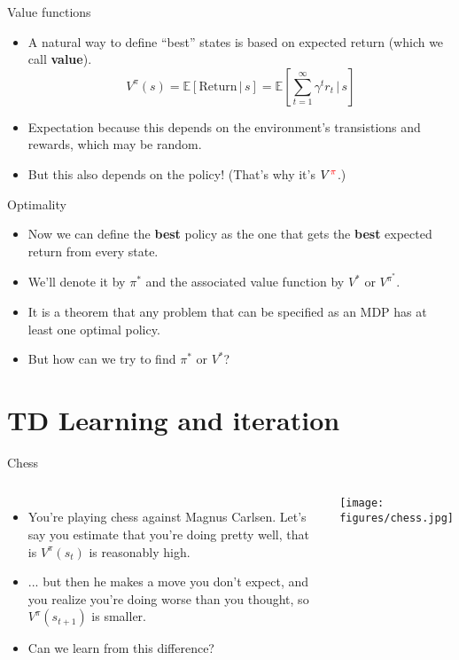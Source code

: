 \documentclass{beamer}
\newcommand{\E}[1]{\mathbb{E}\left[#1\right]}
\begin{document}
\begin{frame}{Value functions} 
\begin{itemize}
\item A natural way to define ``best'' states is based on expected return (which we call \textbf{value}). 
    \[V^\pi(s) = \E{\text{Return} \, |\, s} = \E{\sum_{t=1}^\infty \gamma^t r_t \, \bigg \vert \, s } \]
\item<2-> Expectation because this depends on the environment's transistions and rewards, which may be random.  
\item<3-> But this also depends on the policy! (That's why it's \(V^{\color{red} \pi}\).) 
\end{itemize}
\end{frame}

\begin{frame}{Optimality}
\begin{itemize}
\item Now we can define the \textbf{best} policy as the one that gets the \textbf{best} expected return from every state.
\item<2-> We'll denote it by \(\pi^*\) and the associated value function by \(V^*\) or \(V^{\pi^*}\). 
\item<3-> It is a theorem that any problem that can be specified as an MDP has at least one optimal policy.
\item<4-> But how can we try to find \(\pi^*\) or \(V^*\)?
\end{itemize}
\end{frame}


\section{TD Learning and iteration}
\begin{frame}{Chess}
\begin{columns}
\begin{itemize}
    \item<1-> You're playing chess against Magnus Carlsen. Let's say you estimate that you're doing pretty well, that is \(V^{\pi}(s_t)\) is reasonably high. 
    \item<2-> ... but then he makes a move you don't expect, and you realize you're doing worse than you thought, so \(V^{\pi}(s_{t+1})\) is smaller.
    \item<3-> Can we learn from this difference?
\end{itemize}
    \begin{center}
    \texttt{[image: figures/chess.jpg]}
    \end{center}
\end{columns}
\end{frame}
\end{document}

